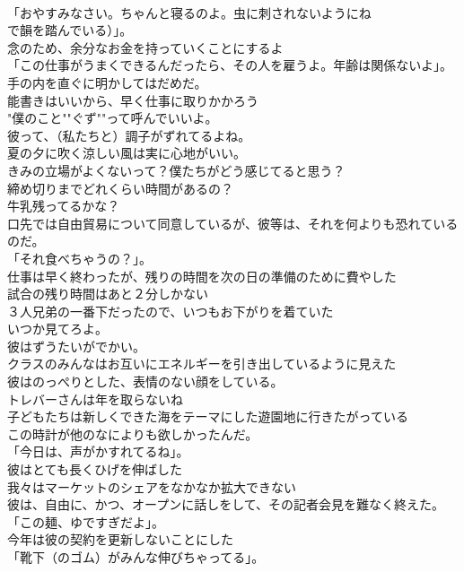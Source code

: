 \documentclass[8pt]{extreport}
\begin{document}
\begin{CJK}{UTF8}{min}
\\	「おやすみなさい。ちゃんと寝るのよ。虫に刺されないようにね
\\	で韻を踏んでいる）」。	
\\	念のため、余分なお金を持っていくことにするよ	
\\	「この仕事がうまくできるんだったら、その人を雇うよ。年齢は関係ないよ」。	
\\	手の内を直ぐに明かしてはだめだ。	
\\	能書きはいいから、早く仕事に取りかかろう	
\\	"僕のこと""ぐず""って呼んでいいよ。
\\	彼って、（私たちと）調子がずれてるよね。	
\\	夏の夕に吹く涼しい風は実に心地がいい。	
\\	きみの立場がよくないって？僕たちがどう感じてると思う？	
\\	締め切りまでどれくらい時間があるの？	
\\	牛乳残ってるかな？	
\\	口先では自由貿易について同意しているが、彼等は、それを何よりも恐れているのだ。	
\\	「それ食べちゃうの？」。	
\\	仕事は早く終わったが、残りの時間を次の日の準備のために費やした	
\\	試合の残り時間はあと２分しかない	
\\	３人兄弟の一番下だったので、いつもお下がりを着ていた	
\\	いつか見てろよ。	
\\	彼はずうたいがでかい。	
\\	クラスのみんなはお互いにエネルギーを引き出しているように見えた	
\\	彼はのっぺりとした、表情のない顔をしている。	
\\	トレバーさんは年を取らないね	
\\	子どもたちは新しくできた海をテーマにした遊園地に行きたがっている	
\\	この時計が他のなによりも欲しかったんだ。	
\\	「今日は、声がかすれてるね」。	
\\	彼はとても長くひげを伸ばした	
\\	我々はマーケットのシェアをなかなか拡大できない	
\\	彼は、自由に、かつ、オープンに話しをして、その記者会見を難なく終えた。	
\\	「この麺、ゆですぎだよ」。	
\\	今年は彼の契約を更新しないことにした	
\\	「靴下（のゴム）がみんな伸びちゃってる」。	

\end{CJK}
\end{document}

